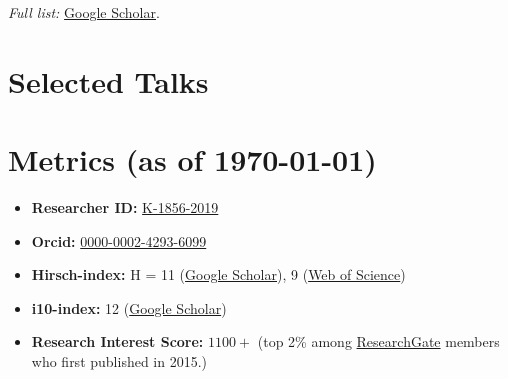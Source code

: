 \documentclass[10pt,a4paper,colorlinks,linkcolor=blue,urlcolor=blue]{moderncv}
\begin{document}
\textit{Full list:} \href{https://scholar.google.com/citations?user=tHb_qZoAAAAJ&hl=en}{Google Scholar}.

\section{Selected Talks}

\section{Metrics (as of \today)}
\begin{itemize}[leftmargin=1.5em]
\item \faIdCard\hspace{0.3em}\textbf{Researcher ID:} \href{https://www.webofscience.com/wos/author/record/K-1856-2019}{K-1856-2019}
\item \faOrcid\hspace{0.3em}\textbf{Orcid:} \href{https://orcid.org/0000-0002-4293-6099}{0000-0002-4293-6099}
\item \faChartLine\hspace{0.3em}\textbf{Hirsch-index:} H = 11 (\href{https://scholar.google.com/citations?hl=en&user=tHb_qZoAAAAJ}{Google Scholar}), 9 (\href{https://www.webofscience.com/wos/author/record/K-1856-2019}{Web of Science})
\item \faFile\hspace{0.3em}\textbf{i10-index:} 12 (\href{https://scholar.google.com/citations?hl=en&user=tHb_qZoAAAAJ}{Google Scholar})
\item \faUsers\hspace{0.3em}\textbf{Research Interest Score:} $1100+$ (top 2\% among \href{https://www.researchgate.net/profile/Vatsal-Sanjay-2}{ResearchGate} members who first published in 2015.)
\end{itemize}
\end{document}
